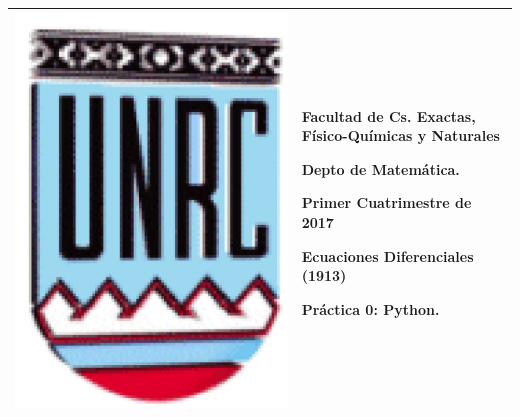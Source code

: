\documentclass{article}
\begin{document}
\setlength{\unitlength}{1cm}
%
\setlength{\extrarowheight}{5mm}
%

\noindent\begin{tabular}{m{} m{}}\hline\hline
\includegraphics[scale=.4]{unrc.jpg} &
\begin{bfseries}  \begin{scshape}
Facultad de Cs. Exactas, F\'isico-Qu\'imicas y Naturales\par
        Depto de Matem\'atica.\par
        Primer Cuatrimestre de 2017\par
        Ecuaciones Diferenciales (1913) \par
        Pr\'actica 0: Python.

\end{scshape}
\end{bfseries}
\\
\hline\hline
\end{tabular}
\renewcommand{\theenumi}{\alph{enumi}}
\end{document}
